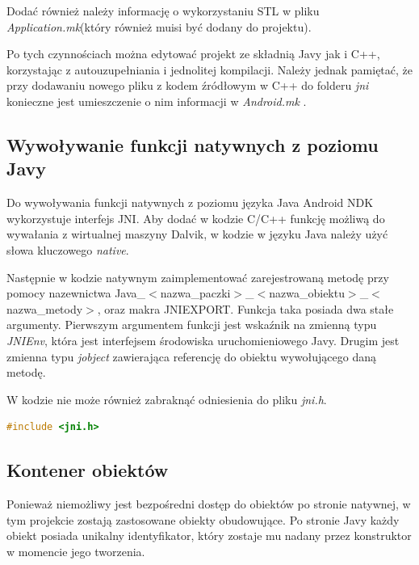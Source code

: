 Dodać również należy informację o wykorzystaniu STL w pliku
\emph{Application.mk}(który również muisi być dodany do projektu).
  

  
Po tych czynnościach można edytować projekt ze składnią Javy jak i C++,
korzystając z autouzupełniania i jednolitej kompilacji. Należy jednak
pamiętać, że przy dodawaniu nowego pliku z kodem źródłowym w C++ do folderu
\emph{jni} konieczne jest umieszczenie o nim informacji w \emph{Android.mk} .

\subsection{Wywoływanie funkcji natywnych z poziomu Javy}
Do wywoływania funkcji natywnych z poziomu języka Java Android NDK wykorzystuje
interfejs JNI. Aby dodać w kodzie C/C++ funkcję możliwą do wywałania z
wirtualnej maszyny Dalvik, w kodzie w języku Java należy użyć słowa kluczowego
\emph{native}.



Następnie w kodzie natywnym zaimplementować zarejestrowaną metodę przy pomocy
nazewnictwa
Java\_$<$nazwa\_paczki$>$\_$<$nazwa\_obiektu$>$\_$<$nazwa\_metody$>$, oraz
makra JNIEXPORT. Funkcja taka posiada dwa stałe argumenty. Pierwszym argumentem
funkcji jest wskaźnik na zmienną typu \emph{JNIEnv}, która jest interfejsem
środowiska uruchomieniowego Javy. Drugim jest zmienna typu \emph{jobject}
zawierająca referencję do obiektu wywołującego daną metodę.

\newpage


W kodzie nie może również zabraknąć odniesienia do pliku \emph{jni.h}.

\begin{lstlisting}[language=c++, caption=Użycie pliku nagłówkowego]
#include <jni.h>
\end{lstlisting}

\subsection{Kontener obiektów}
Ponieważ niemożliwy jest bezpośredni dostęp do obiektów po stronie natywnej,
w tym projekcie zostają zastosowane obiekty obudowujące. Po stronie Javy każdy
obiekt posiada unikalny identyfikator, który zostaje mu nadany przez
konstruktor w momencie jego tworzenia.

